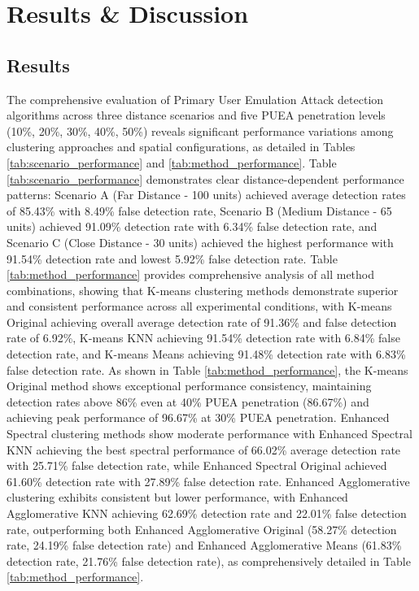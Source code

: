 \chapter{Results \& Discussion}
\label{Chapter5}

\section{Results}

The comprehensive evaluation of Primary User Emulation Attack detection algorithms across three distance scenarios and five PUEA penetration levels (10\%, 20\%, 30\%, 40\%, 50\%) reveals significant performance variations among clustering approaches and spatial configurations, as detailed in Tables \ref{tab:scenario_performance} and \ref{tab:method_performance}. Table \ref{tab:scenario_performance} demonstrates clear distance-dependent performance patterns: Scenario A (Far Distance - 100 units) achieved average detection rates of 85.43\% with 8.49\% false detection rate, Scenario B (Medium Distance - 65 units) achieved 91.09\% detection rate with 6.34\% false detection rate, and Scenario C (Close Distance - 30 units) achieved the highest performance with 91.54\% detection rate and lowest 5.92\% false detection rate. Table \ref{tab:method_performance} provides comprehensive analysis of all method combinations, showing that K-means clustering methods demonstrate superior and consistent performance across all experimental conditions, with K-means Original achieving overall average detection rate of 91.36\% and false detection rate of 6.92\%, K-means KNN achieving 91.54\% detection rate with 6.84\% false detection rate, and K-means Means achieving 91.48\% detection rate with 6.83\% false detection rate. As shown in Table \ref{tab:method_performance}, the K-means Original method shows exceptional performance consistency, maintaining detection rates above 86\% even at 40\% PUEA penetration (86.67\%) and achieving peak performance of 96.67\% at 30\% PUEA penetration. Enhanced Spectral clustering methods show moderate performance with Enhanced Spectral KNN achieving the best spectral performance of 66.02\% average detection rate with 25.71\% false detection rate, while Enhanced Spectral Original achieved 61.60\% detection rate with 27.89\% false detection rate. Enhanced Agglomerative clustering exhibits consistent but lower performance, with Enhanced Agglomerative KNN achieving 62.69\% detection rate and 22.01\% false detection rate, outperforming both Enhanced Agglomerative Original (58.27\% detection rate, 24.19\% false detection rate) and Enhanced Agglomerative Means (61.83\% detection rate, 21.76\% false detection rate), as comprehensively detailed in Table \ref{tab:method_performance}.

